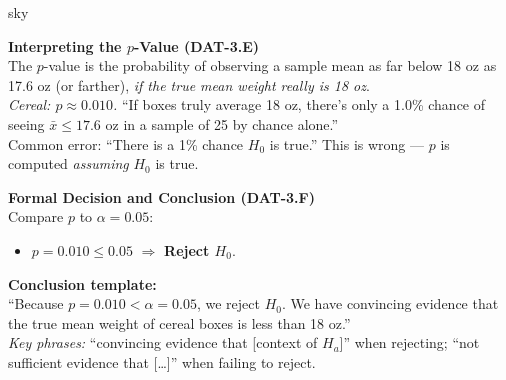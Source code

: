 \documentclass[10pt]{article}
\begin{document}
\begin{skillbox}{sky}
\begin{minipage}[t]{0.48\linewidth}
    \textbf{Interpreting the $p$-Value (DAT-3.E)}\\
    The $p$-value is the probability of observing a sample mean as far below 18 oz as 17.6 oz
    (or farther), \emph{if the true mean weight really is 18 oz}.\\[6pt]
    \textit{Cereal: $p \approx 0.010$.} ``If boxes truly average 18 oz, there's only a 1.0\%
    chance of seeing $\bar x \le 17.6$ oz in a sample of 25 by chance alone.''\\[4pt]
    Common error: ``There is a 1\% chance $H_0$ is true.'' This is wrong --- $p$ is computed
    \emph{assuming} $H_0$ is true.
\end{minipage}
\hfill
\begin{minipage}[t]{0.48\linewidth}
    \textbf{Formal Decision and Conclusion (DAT-3.F)}\\
    Compare $p$ to $\alpha = 0.05$:
    \begin{itemize}
        \item $p = 0.010 \le 0.05$ $\Rightarrow$ \textbf{Reject $H_0$}.
    \end{itemize}
    \textbf{Conclusion template:}\\
    ``Because $p = 0.010 < \alpha = 0.05$, we reject $H_0$. We have convincing evidence that
    the true mean weight of cereal boxes is less than 18 oz.''\\[4pt]
    \textit{Key phrases:} ``convincing evidence that [context of $H_a$]'' when rejecting;
    ``not sufficient evidence that [\ldots]'' when failing to reject.
\end{minipage}
\end{skillbox}
\end{document}

